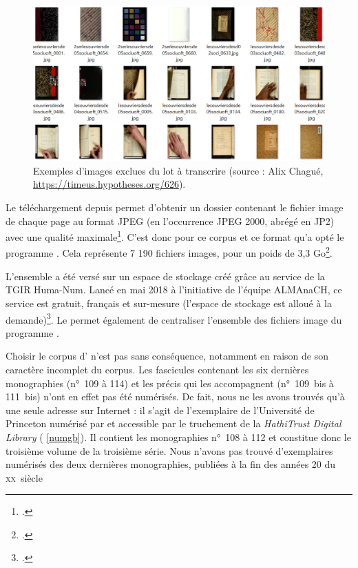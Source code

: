 \begin{figure}[h]
    \centering
    \includegraphics[width=15cm]{img/ex_tri.png}
    \caption[Images exclues du lot à transcrire]{Exemples d'images exclues du lot à transcrire (source : Alix Chagué, \url{https://timeus.hypotheses.org/626}).}
    \label{fig:ex_tri}
\end{figure}

Le téléchargement depuis \ia{} permet d'obtenir un dossier contenant le fichier image de chaque page au format JPEG (en l'occurrence JPEG 2000, abrégé en JP2) avec une qualité maximale\footcite{chague2}. C'est donc pour ce corpus et ce format qu'a opté le programme \timeus. Cela représente 7 190 fichiers images, pour un poids de 3,3 Go\footcite{chague2}.

L'ensemble a été versé sur un espace de stockage créé grâce au service \sharedocs de la TGIR Huma-Num. Lancé en mai 2018 à l'initiative de l'équipe ALMAnaCH, ce service est gratuit, français et sur-mesure (l'espace de stockage est alloué à la demande)\footcite[p. 33-34]{chague2}. Le \sharedocs{} permet également de centraliser l'ensemble des fichiers image du programme \timeus.

Choisir le corpus d'\ia{} n'est pas sans conséquence, notamment en raison de son caractère incomplet du corpus. Les fascicules contenant les six dernières monographies (n°~109 à 114) et les précis qui les accompagnent (n°~109~bis à 111~bis) n'ont en effet pas été numérisés. De fait, nous ne les avons trouvés qu'à une seule adresse sur Internet : il s'agit de l'exemplaire de l'Université de Princeton numérisé par \gb{} et accessible par le truchement de la \textit{HathiTrust Digital Library} (\ann{} \ref{numgb}). Il contient les monographies n°~108 à 112 et constitue donc le troisième volume de la troisième série. Nous n'avons pas trouvé d'exemplaires numérisés des deux dernières monographies, publiées à la fin des années 20 du \textsc{xx}\ieme~siècle

